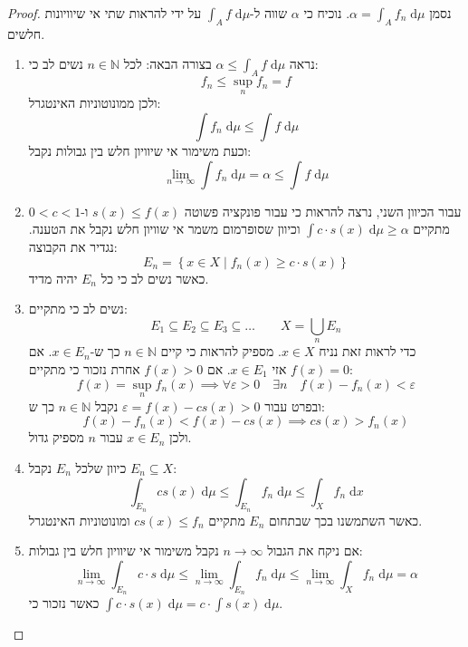 \documentclass{tstextbook}
\begin{document}
\begin{proof}
נסמן \(\alpha=\int _{A} f_{n} \;\mathrm{d} \mu\). נוכיח כי \(\alpha\) שווה ל-\(\int _{A}f \;\mathrm{d} \mu\) על ידי להראות שתי אי שיוויונות חלשים.

  \begin{enumerate}
    \item נראה \(\alpha \leq \int_{A} f \;\mathrm{d} \mu\) בצורה הבאה: 
לכל \(n\in \mathbb{N}\) נשים לב כי:
$$f_{n}\leq \sup _{n}f_{n}=f$$
ולכן ממונוטוניות האינטגרל:
$$\int f_{n} \;\mathrm{d} \mu \leq \int f \;\mathrm{d} \mu $$
וכעת משימור אי שיוויון חלש בין גבולות נקבל:
$$\lim_{ n \to \infty } \int f_{n} \;\mathrm{d} \mu=\alpha \leq \int f \;\mathrm{d} \mu  $$


    \item עבור הכיוון השני, נרצה להראות כי עבור פונקציה פשוטה \(s(x)\leq f(x)\) ו-\(0<c<1\) מתקיים \(\int c\cdot s(x) \;\mathrm{d} \mu \geq \alpha\) וכיוון שסופרמום משמר אי שוויון חלש נקבל את הטענה. נגדיר את הקבוצה: 
$$E_{n}=\left\{  x \in X\mid f_{n}(x)\geq c\cdot s(x)  \right\}$$
כאשר נשים לב כי כל \(E_{n}\) יהיה מדיד.


    \item נשים לב כי מתקיים: 
$$E_{1} \subseteq E_{2} \subseteq E_{3} \subseteq\dots \qquad X=\bigcup_{n}E_{n}$$
כדי לראות זאת נניח \(x \in X\). מספיק להראות כי קיים \(n \in \mathbb{N}\) כך ש-\(x \in E_{n}\).
אם \(f(x)=0\) אזי \(x \in E_{1}\). אם \(f(x)> 0\) אחרת נזכור כי מתקיים:
$$f(x)=\sup_{n} f_{n}(x)\implies \forall \varepsilon>0 \quad \exists n \quad f(x)-f_{n}(x)<\varepsilon$$
ובפרט עבור \(\varepsilon=f(x)-cs(x)>0\) נקבל \(n \in \mathbb{N}\) כך ש:
$$f(x)-f_{n}(x)<f(x)-cs(x)\implies cs(x)> f_{n}(x)$$
ולכן \(x \in E_{n}\) עבור \(n\) מספיק גדול.


    \item כיוון שלכל \(E_{n}\) נקבל \(E_{n}\subseteq  X\): 
$$\int_{E_{n}}  c s(x) \;\mathrm{d} \mu \leq\int_{E_{n}} f_{n} \;\mathrm{d} \mu \leq \int _{X} f_{n}\;\mathrm{d} x  $$
כאשר השתמשנו בכך שבתחום \(E_{n}\) מתקיים \(cs(x)\leq f_{n}\) ומונוטוניות האינטגרל.


    \item אם ניקח את הגבול \(n\to \infty\) נקבל משימור אי שיוויון חלש בין גבולות: 
$$\lim_{ n \to \infty } \int _{E_{n}}c\cdot s \;\mathrm{d} \mu \leq \lim_{ n \to \infty } \int _{E_{n}}f_{n} \;\mathrm{d} \mu \leq \lim_{ n \to \infty } \int _{X}f_{n} \;\mathrm{d} \mu = \alpha$$
כאשר נזכור כי \(\int c\cdot s(x) \;\mathrm{d} \mu=c\cdot \int s(x) \;\mathrm{d} \mu\).



\end{enumerate}
\end{proof}
\end{document}
